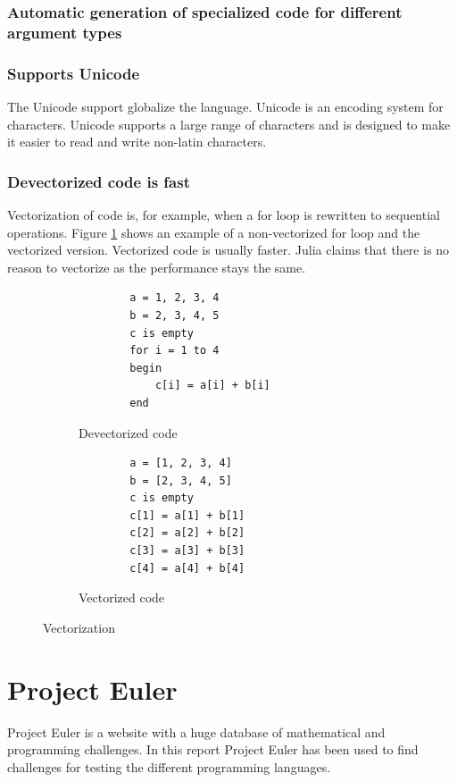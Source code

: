 \documentclass[a4paper, 11pt, titlepage]{article}
\begin{document}
\subsubsection{Automatic generation of specialized code for different argument types}

\subsubsection{Supports Unicode}
The Unicode support globalize the language. Unicode is an encoding system for characters. Unicode supports a large range of characters and is designed to make it easier to read and write non-latin characters.

\subsubsection{Devectorized code is fast}
Vectorization of code is, for example, when a for loop is rewritten to sequential operations. Figure \ref{vec} shows an example of a non-vectorized for loop and the vectorized version. Vectorized code is usually faster. Julia claims that there is no reason to vectorize as the performance stays the same.

\begin{figure}[H]
	\centering
	\begin{subfigure}[b]{0.7\textwidth}
		\centering
		\begin{lstlisting}
		a = 1, 2, 3, 4
		b = 2, 3, 4, 5
		c is empty
		for i = 1 to 4
		begin
			c[i] = a[i] + b[i]
		end
		\end{lstlisting}
		\caption{Devectorized code}
	\end{subfigure}
	\begin{subfigure}[b]{0.7\textwidth}
		\centering
		\begin{lstlisting}
		a = [1, 2, 3, 4]
		b = [2, 3, 4, 5]
		c is empty
		c[1] = a[1] + b[1]
		c[2] = a[2] + b[2]
		c[3] = a[3] + b[3]
		c[4] = a[4] + b[4]
		\end{lstlisting}
		\caption{Vectorized code}
	\end{subfigure}	
	\caption{Vectorization}
	\label{vec}
\end{figure}

\section{Project Euler}
Project Euler is a website with a huge database of mathematical and programming challenges. In this report Project Euler has been used to find challenges for testing the different programming languages.
\end{document}
